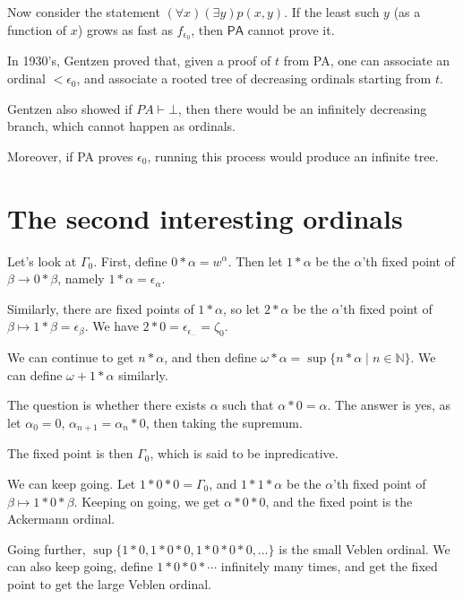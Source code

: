 \documentclass[12pt]{article}
\begin{document}
Now consider the statement $(\forall x)(\exists y)p(x,y)$. If the least such $y$ (as a function of $x$) grows as fast as $f_{\epsilon_0}$, then $\mathsf{PA}$ cannot prove it.

In 1930's, Gentzen proved that, given a proof of $t$ from PA, one can associate an ordinal $< \epsilon_0$, and associate a rooted tree of decreasing ordinals starting from $t$.

Gentzen also showed if $PA \vdash \bot$, then there would be an infinitely decreasing branch, which cannot happen as ordinals.

Moreover, if PA proves $\epsilon_0$, running this process would produce an infinite tree.

\section{The second interesting ordinals}

Let's look at $\Gamma_0$. First, define $0 \ast \alpha = w^{\alpha}$. Then let $1 \ast \alpha$ be the $\alpha$'th fixed point of $\beta \to 0 \ast \beta$, namely $1 \ast \alpha = \epsilon_{\alpha}$.

Similarly, there are fixed points of $1 \ast \alpha$, so let $2 \ast \alpha$ be the $\alpha$'th fixed point of $\beta \mapsto 1 \ast \beta = \epsilon_{\beta}$. We have $2 \ast 0 = \epsilon_{\epsilon_{\cdots}} = \zeta_0$.

We can continue to get $n \ast \alpha$, and then define $\omega \ast \alpha = \sup\{n \ast \alpha \mid n \in \mathbb{N}\}$. We can define $\omega + 1 \ast \alpha$ similarly.

The question is whether there exists $\alpha$ such that $\alpha \ast 0 = \alpha$. The answer is yes, as let $\alpha_0 = 0$, $\alpha_{n+1} = \alpha_n \ast 0$, then taking the supremum.

The fixed point is then $\Gamma_0$, which is said to be inpredicative.

We can keep going. Let $1 \ast 0 \ast 0 = \Gamma_0$, and $1 \ast 1 \ast \alpha$ be the $\alpha$'th fixed point of $\beta \mapsto 1 \ast 0 \ast \beta$. Keeping on going, we get $\alpha \ast 0 \ast 0$, and the fixed point is the Ackermann ordinal.

Going further, $\sup\{1 \ast 0, 1 \ast 0 \ast 0, 1 \ast 0 \ast 0 \ast 0, \ldots\}$ is the small Veblen ordinal. We can also keep going, define $1 \ast 0 \ast 0 \ast \cdots$ infinitely many times, and get the fixed point to get the large Veblen ordinal.
\end{document}

